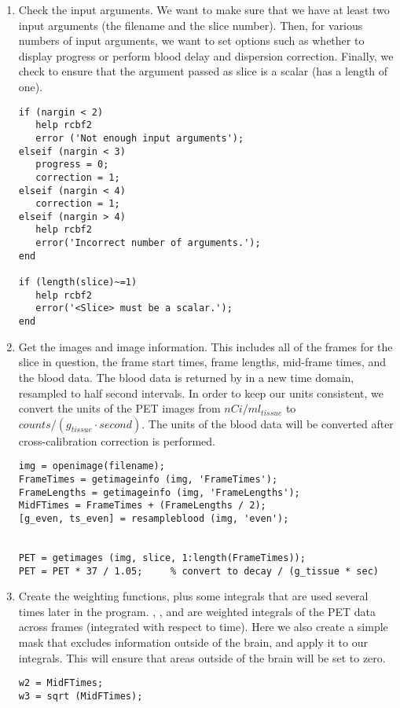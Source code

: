 \begin{enumerate}
\item Check the input arguments.  We want to make sure that we have
at least two input arguments (the filename and the slice number).
Then, for various numbers of input arguments, we want to set options
such as whether to display progress or perform blood delay and
dispersion correction.  Finally, we check to ensure that the
argument passed as slice is a scalar (has a length of one).
\begin{verbatim}
if (nargin < 2)
   help rcbf2
   error ('Not enough input arguments');
elseif (nargin < 3)
   progress = 0;
   correction = 1;
elseif (nargin < 4)
   correction = 1;
elseif (nargin > 4)
   help rcbf2
   error('Incorrect number of arguments.');
end

if (length(slice)~=1)
   help rcbf2
   error('<Slice> must be a scalar.');
end
\end{verbatim}

\item Get the images and image information.  This includes all of the
frames for the slice in question, the frame start times, frame
lengths, mid-frame times, and the blood data.  The blood data is
returned by  in a new time domain, resampled to
half second intervals.  In order to keep our units consistent, we
convert the units of the PET images from $nCi/ml_{tissue}$ to $counts
/ (g_{tissue} \cdot second)$.  The units of the blood data will be
converted after cross-calibration correction is performed.
\begin{verbatim}
img = openimage(filename);
FrameTimes = getimageinfo (img, 'FrameTimes');
FrameLengths = getimageinfo (img, 'FrameLengths');
MidFTimes = FrameTimes + (FrameLengths / 2);
[g_even, ts_even] = resampleblood (img, 'even');


PET = getimages (img, slice, 1:length(FrameTimes));
PET = PET * 37 / 1.05;     % convert to decay / (g_tissue * sec)
\end{verbatim}

\item Create the weighting functions, plus some integrals that are
used several times later in the program.  ,
, and  are weighted integrals of the
PET data across frames (integrated with respect to time).  Here we
also create a simple mask that excludes information outside of the
brain, and apply it to our integrals.  This will ensure that areas
outside of the brain will be set to zero.
\begin{verbatim}
w2 = MidFTimes;
w3 = sqrt (MidFTimes);


\end{verbatim}
\end{enumerate}
